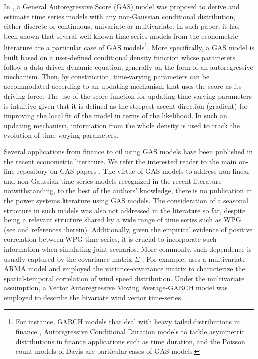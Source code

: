 \documentclass[a4paper]{IEEEtran}
\begin{document}
In \cite{creal2013generalized}, a General Autoregressive Score (GAS) model was proposed to derive and estimate time series models with any non-Gaussian conditional distribution, either discrete or continuous, univariate or multivariate. In such paper, it has been shown that several well-known time-series models from the econometric literature are a particular case of GAS models\footnote{For instance, GARCH models that deal with heavy tailed distributions in finance \cite{engle1986modelling}, Autoregressive Conditional Duration models \cite{engle1998autoregressive} to tackle asymmetric distributions in finance applications such as time duration, and the Poisson count models of Davis \cite{davis2003observation} are particular cases of GAS models.}. More specifically, a GAS model is built based on a user-defined conditional density function whose parameters follow a data-driven dynamic equation, generally on the form of an autoregressive mechanism. Then, by construction, time-varying parameters can be accommodated according to an updating mechanism that uses the score as its driving force. The use of the score function for updating time-varying parameters is intuitive given that it is defined as the steepest ascent direction (gradient) for improving the local fit of the model in terms of the likelihood. In such an updating mechanism, information from the whole density is used to track the evolution of time varying parameters. 

Several applications from finance to oil using GAS models have been published in the recent econometric literature. We refer the interested reader to the main on-line repository on GAS papers \cite{GASwebpage}. The virtue of GAS models to address non-linear and non-Gaussian time series models recognized in the recent literature notwithstanding, to the best of the authors' knowledge, there is no publication in the power systems literature using GAS models. The consideration of a seasonal structure in such models was also not addressed in the literature so far, despite being a relevant structure shared by a wide range of time series such as WPG (see \cite{tseng2002fuzzy,lei2009review,FosteringWPP,souto2014high} and references therein). Additionally, given the empirical evidence of positive correlation between WPG time series, it is crucial to incorporate such information when simulating joint scenarios. More commonly, such dependence is usually captured by the covariance matrix $\Sigma$ \cite{pinson2009probabilistic}. For example, \cite{morales2010methodology} uses a multivariate ARMA model and employed the variance-covariance matrix to characterize the spatial-temporal correlation of wind speed distribution. Under the multivariate assumption, a Vector Autoregressive Moving Average-GARCH model was employed to describe the bivariate wind vector time-series \cite{jeon2012using}. 
\end{document}

